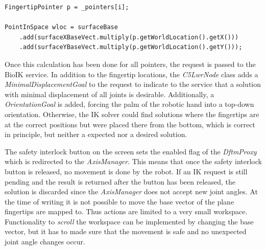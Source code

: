 \begin{lstlisting}[caption={Mapping of points from two into three dimensions},label=lst:impl:dftm:mapping]
FingertipPointer p = _pointers[i];

PointInSpace wloc = surfaceBase
	.add(surfaceXBaseVect.multiply(p.getWorldLocation().getX()))
	.add(surfaceYBaseVect.multiply(p.getWorldLocation().getY()));
\end{lstlisting}

Once this calculation has been done for all pointers, the request is passed to the BioIK service. In addition to the fingertip locations, the \textit{C5LwrNode} class adds a \textit{MinimalDisplacementGoal} to the request to indicate to the service that a solution with minimal displacement of all joints is desirable. Additionally, a \textit{OrientationGoal} is added, forcing the palm of the robotic hand into a top-down orientation. Otherwise, the IK solver could find solutions where the fingertips are at the correct positions but were placed there from the bottom, which is correct in principle, but neither a expected nor a desired solution.

The safety interlock button on the screen sets the enabled flag of the \textit{DftmProxy} which is redirected to the \textit{AxisManager}. This means that once the safety interlock button is released, no movement is done by the robot. If an IK request is still pending and the result is returned after the button has been released, the solution is discarded since the \textit{AxisManager} does not accept new joint angles. At the time of writing it is not possible to move the base vector of the plane fingertips are mapped to. Thus actions are limited to a very small workspace. Functionality to \textit{scroll} the workspace can be implemented by changing the base vector, but it has to made sure that the movement is safe and no unexpected joint angle changes occur.